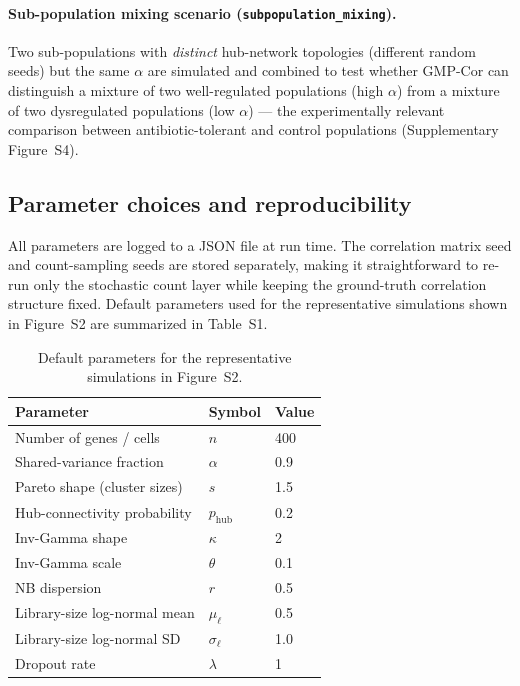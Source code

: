 \paragraph{Sub-population mixing scenario (\texttt{subpopulation\_mixing}).}
Two sub-populations with \emph{distinct} hub-network topologies (different random
seeds) but the same $\alpha$ are simulated and combined to test whether GMP-Cor
can distinguish a mixture of two well-regulated populations (high $\alpha$) from
a mixture of two dysregulated populations (low $\alpha$) — the experimentally
relevant comparison between antibiotic-tolerant and control populations (Supplementary
Figure~S4).

\subsection*{Parameter choices and reproducibility}

All parameters are logged to a JSON file at run time.
The correlation matrix seed and count-sampling seeds are stored separately,
making it straightforward to re-run only the stochastic count layer while
keeping the ground-truth correlation structure fixed.
Default parameters used for the representative simulations shown in Figure~S2 are
summarized in Table~S1.

\begin{table}[h!]
\centering
\caption{Default parameters for the representative simulations in Figure~S2.}
\begin{tabular}{lll}
\hline
\textbf{Parameter} & \textbf{Symbol} & \textbf{Value} \\
\hline
Number of genes / cells      & $n$                           & 400 \\
Shared-variance fraction     & $\alpha$                      & 0.9 \\
Pareto shape (cluster sizes) & $s$                           & 1.5 \\
Hub-connectivity probability & $p_\mathrm{hub}$              & 0.2 \\
Inv-Gamma shape              & $\kappa$                      & 2   \\
Inv-Gamma scale              & $\theta$                      & 0.1 \\
NB dispersion                & $r$                           & 0.5 \\
Library-size log-normal mean & $\mu_\ell$                    & 0.5 \\
Library-size log-normal SD   & $\sigma_\ell$                 & 1.0 \\
Dropout rate                 & $\lambda$                     & 1   \\
\hline
\end{tabular}
\end{table}